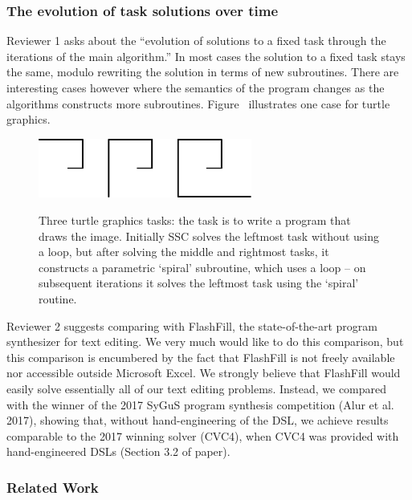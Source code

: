 \documentclass{article}
\begin{document}
\subsubsection*{The evolution of task solutions over time}
Reviewer 1 asks about the ``evolution of solutions to a fixed task through the iterations of the main algorithm.''
In most cases the solution to a fixed task
stays the same,
modulo rewriting the solution in terms of new subroutines.
There are interesting cases however where the
semantics of the program changes as the algorithms constructs more subroutines. Figure~\cite{geomCompiled}
illustrates one case for turtle graphics.
\begin{figure}
  \centering
  \includegraphics[width=7cm]{figures/rebutal/spirals.eps}\label{geomCompiled}
  \caption{Three turtle graphics tasks: the task is to write a program that draws the image. Initially SSC solves the leftmost task without using a loop, but after solving the middle and rightmost tasks,
  it constructs a parametric `spiral' subroutine, which uses a loop -- on subsequent iterations it solves the leftmost task using the `spiral' routine.}
\end{figure}

Reviewer 2 suggests comparing with FlashFill, the state-of-the-art program synthesizer for text editing.
We very much would like to do this comparison, but this comparison
is encumbered by the fact that FlashFill is not freely available nor accessible outside Microsoft Excel.
We strongly believe that FlashFill would easily solve essentially all of our text editing problems.
Instead, we compared with the winner of the 2017 SyGuS program synthesis competition (Alur et al. 2017), 
showing that, without hand-engineering of the DSL,
we achieve results comparable to the 2017 winning solver (CVC4),
when CVC4 was provided with hand-engineered DSLs (Section 3.2 of paper).
\subsubsection*{Related Work}
\end{document}
